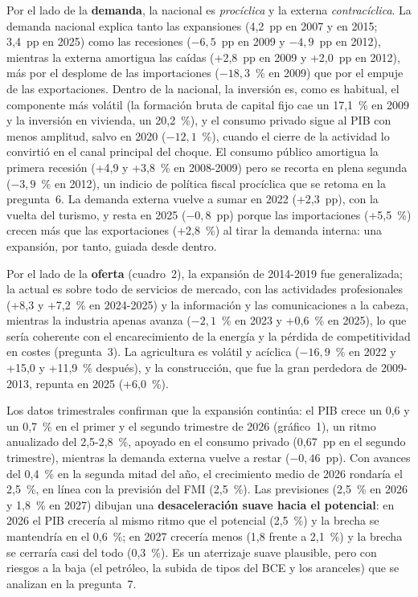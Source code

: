 \begin{examen}
Por el lado de la \textbf{demanda}, la nacional es \emph{procíclica} y la externa \emph{contracíclica}. La demanda nacional explica tanto las expansiones (4,2~pp en 2007 y en 2015; 3,4~pp en 2025) como las recesiones ($-6{,}5$~pp en 2009 y $-4{,}9$~pp en 2012), mientras la externa amortigua las caídas (+2,8~pp en 2009 y +2,0~pp en 2012), más por el desplome de las importaciones ($-18{,}3$~\% en 2009) que por el empuje de las exportaciones. Dentro de la nacional, la inversión es, como es habitual, el componente más volátil (la formación bruta de capital fijo cae un 17,1~\% en 2009 y la inversión en vivienda, un 20,2~\%), y el consumo privado sigue al PIB con menos amplitud, salvo en 2020 ($-12{,}1$~\%), cuando el cierre de la actividad lo convirtió en el canal principal del choque. El consumo público amortigua la primera recesión (+4,9 y +3,8~\% en 2008-2009) pero se recorta en plena segunda ($-3{,}9$~\% en 2012), un indicio de política fiscal procíclica que se retoma en la pregunta~6. La demanda externa vuelve a sumar en 2022 (+2,3~pp), con la vuelta del turismo, y resta en 2025 ($-0{,}8$~pp) porque las importaciones (+5,5~\%) crecen más que las exportaciones (+2,8~\%) al tirar la demanda interna: una expansión, por tanto, guiada desde dentro.

Por el lado de la \textbf{oferta} (cuadro~2), la expansión de 2014-2019 fue generalizada; la actual es sobre todo de servicios de mercado, con las actividades profesionales (+8,3 y +7,2~\% en 2024-2025) y la información y las comunicaciones a la cabeza, mientras la industria apenas avanza ($-2{,}1$~\% en 2023 y +0,6~\% en 2025), lo que sería coherente con el encarecimiento de la energía y la pérdida de competitividad en costes (pregunta~3). La agricultura es volátil y acíclica ($-16{,}9$~\% en 2022 y +15,0 y +11,9~\% después), y la construcción, que fue la gran perdedora de 2009-2013, repunta en 2025 (+6,0~\%).

Los datos trimestrales confirman que la expansión continúa: el PIB crece un 0,6 y un 0,7~\% en el primer y el segundo trimestre de 2026 (gráfico~1), un ritmo anualizado del 2,5-2,8~\%, apoyado en el consumo privado (0,67~pp en el segundo trimestre), mientras la demanda externa vuelve a restar ($-0{,}46$~pp). Con avances del 0,4~\% en la segunda mitad del año, el crecimiento medio de 2026 rondaría el 2,5~\%, en línea con la previsión del FMI (2,5~\%). Las previsiones (2,5~\% en 2026 y 1,8~\% en 2027) dibujan una \textbf{desaceleración suave hacia el potencial}: en 2026 el PIB crecería al mismo ritmo que el potencial (2,5~\%) y la brecha se mantendría en el 0,6~\%; en 2027 crecería menos (1,8 frente a 2,1~\%) y la brecha se cerraría casi del todo (0,3~\%). Es un aterrizaje suave plausible, pero con riesgos a la baja (el petróleo, la subida de tipos del BCE y los aranceles) que se analizan en la pregunta~7.


\end{examen}
